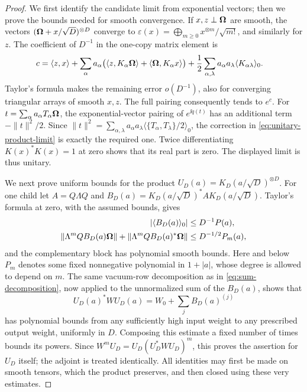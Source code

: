 \begin{proof}
We first identify the candidate limit from exponential vectors;
then we prove the bounds needed for smooth convergence.  If $x,z\perp\boldsymbol\Omega$
are smooth, the vectors
$(\boldsymbol\Omega+x/\sqrt D)^{\otimes D}$ converge to
$\varepsilon(x)=\bigoplus_{m\geq0}x^{\otimes m}/\sqrt{m!}$,
and similarly for $z$.  The coefficient of $D^{-1}$ in the
one-copy matrix element is
\begin{align*}
 c={}&\langle z,x\rangle
 +\sum_\alpha a_\alpha
       \bigl(\langle z,K_\alpha\boldsymbol\Omega\rangle
                      +\langle \boldsymbol\Omega,K_\alpha x\rangle\bigr)
 +\frac12\sum_{\alpha,\lambda}a_\alpha a_\lambda
                        \langle K_{\alpha\lambda}\rangle_0.
\end{align*}
Taylor's formula makes the remaining error $o(D^{-1})$, also
for converging triangular arrays of smooth $x,z$.  The full
pairing consequently tends to $e^c$.  For
$t=\sum_\alpha a_\alpha T_\alpha\boldsymbol\Omega$, the exponential-vector
pairing of $e^{\ii q(t)}$ has an additional term $-\|t\|^2/2$.
Since
$\|t\|^2=\sum_{\alpha,\lambda}a_\alpha a_\lambda
\langle\{T_\alpha,T_\lambda\}/2\rangle_0$,
the correction in \eqref{eq:unitary-product-limit} is exactly
the required one.  Twice differentiating $K(x)^*K(x)=1$ at zero
shows that its real part is zero. The displayed limit is thus unitary.

We next prove uniform bounds for the product
$U_D(a)=K_D(a/\sqrt D)^{\otimes D}$. For one child let $A=Q\Lambda Q$ and
$B_D(a)=K_D(a/\sqrt D)^*A K_D(a/\sqrt D)$.  Taylor's formula
at zero, with the assumed bounds, gives
\begin{align*}
 |\langle B_D(a)\rangle_0|&\leq D^{-1}P(a),\\
 \|\Lambda^m QB_D(a)\boldsymbol\Omega\|
  +\|\Lambda^m QB_D(a)^*\boldsymbol\Omega\|&\leq D^{-1/2}P_m(a),
\end{align*}
and the complementary block has polynomial smooth bounds.  Here
and below $P_m$ denotes some fixed nonnegative polynomial in
$1+|a|$, whose degree is allowed to depend on $m$.
The same vacuum-row decomposition as in
\eqref{eq:sum-decomposition}, now applied to the unnormalized
sum of the $B_D(a)$, shows that
\[
 U_D(a)^*WU_D(a)=W_0+\sum_jB_D(a)^{(j)}
\]
has polynomial bounds from any sufficiently high input weight
to any prescribed output weight, uniformly in $D$.
Composing this estimate a fixed number of times bounds its powers.
Since $W^mU_D=U_D(U_D^*WU_D)^m$, this proves the assertion for
$U_D$ itself; the adjoint is treated identically.  All identities
may first be made on smooth tensors, which the product preserves,
and then closed using these very estimates.


\end{proof}
